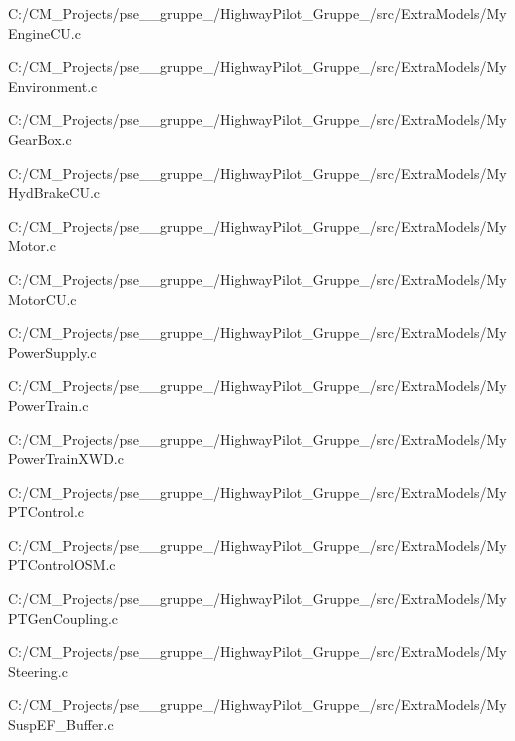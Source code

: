 \begin{DoxyCompactItemize}
C\+:/\+C\+M\+\_\+\+Projects/pse\+\_\+\_\+gruppe\+\_/\+Highway\+Pilot\+\_\+\+Gruppe\+\_/src/\+Extra\+Models/My\+Engine\+C\+U.\+c\item 
C\+:/\+C\+M\+\_\+\+Projects/pse\+\_\+\_\+gruppe\+\_/\+Highway\+Pilot\+\_\+\+Gruppe\+\_/src/\+Extra\+Models/My\+Environment.\+c\item 
C\+:/\+C\+M\+\_\+\+Projects/pse\+\_\+\_\+gruppe\+\_/\+Highway\+Pilot\+\_\+\+Gruppe\+\_/src/\+Extra\+Models/My\+Gear\+Box.\+c\item 
C\+:/\+C\+M\+\_\+\+Projects/pse\+\_\+\_\+gruppe\+\_/\+Highway\+Pilot\+\_\+\+Gruppe\+\_/src/\+Extra\+Models/My\+Hyd\+Brake\+C\+U.\+c\item 
C\+:/\+C\+M\+\_\+\+Projects/pse\+\_\+\_\+gruppe\+\_/\+Highway\+Pilot\+\_\+\+Gruppe\+\_/src/\+Extra\+Models/My\+Motor.\+c\item 
C\+:/\+C\+M\+\_\+\+Projects/pse\+\_\+\_\+gruppe\+\_/\+Highway\+Pilot\+\_\+\+Gruppe\+\_/src/\+Extra\+Models/My\+Motor\+C\+U.\+c\item 
C\+:/\+C\+M\+\_\+\+Projects/pse\+\_\+\_\+gruppe\+\_/\+Highway\+Pilot\+\_\+\+Gruppe\+\_/src/\+Extra\+Models/My\+Power\+Supply.\+c\item 
C\+:/\+C\+M\+\_\+\+Projects/pse\+\_\+\_\+gruppe\+\_/\+Highway\+Pilot\+\_\+\+Gruppe\+\_/src/\+Extra\+Models/My\+Power\+Train.\+c\item 
C\+:/\+C\+M\+\_\+\+Projects/pse\+\_\+\_\+gruppe\+\_/\+Highway\+Pilot\+\_\+\+Gruppe\+\_/src/\+Extra\+Models/My\+Power\+Train\+X\+W\+D.\+c\item 
C\+:/\+C\+M\+\_\+\+Projects/pse\+\_\+\_\+gruppe\+\_/\+Highway\+Pilot\+\_\+\+Gruppe\+\_/src/\+Extra\+Models/My\+P\+T\+Control.\+c\item 
C\+:/\+C\+M\+\_\+\+Projects/pse\+\_\+\_\+gruppe\+\_/\+Highway\+Pilot\+\_\+\+Gruppe\+\_/src/\+Extra\+Models/My\+P\+T\+Control\+O\+S\+M.\+c\item 
C\+:/\+C\+M\+\_\+\+Projects/pse\+\_\+\_\+gruppe\+\_/\+Highway\+Pilot\+\_\+\+Gruppe\+\_/src/\+Extra\+Models/My\+P\+T\+Gen\+Coupling.\+c\item 
C\+:/\+C\+M\+\_\+\+Projects/pse\+\_\+\_\+gruppe\+\_/\+Highway\+Pilot\+\_\+\+Gruppe\+\_/src/\+Extra\+Models/My\+Steering.\+c\item 
C\+:/\+C\+M\+\_\+\+Projects/pse\+\_\+\_\+gruppe\+\_/\+Highway\+Pilot\+\_\+\+Gruppe\+\_/src/\+Extra\+Models/My\+Susp\+E\+F\+\_\+\+Buffer.\+c\item 

\end{DoxyCompactItemize}
